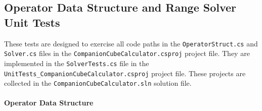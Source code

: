 \documentclass[12pt, titlepage]{article}
\begin{document}
\subsection{Operator Data Structure and Range Solver Unit Tests}
These tests are designed to exercise all code paths in the 
\texttt{OperatorStruct.cs} and \texttt{Solver.cs} 
files in the \texttt{CompanionCubeCalculator.csproj} project file. They are 
implemented in the \texttt{SolverTests.cs} file in the \\
\texttt{UnitTests\_CompanionCubeCalculator.csproj} project file. These projects 
are collected in the \texttt{CompanionCubeCalculator.sln} solution file.

\paragraph{Operator Data Structure}
\end{document}
